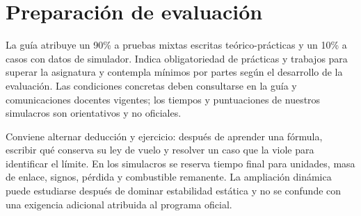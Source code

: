 \section{Preparación de evaluación}
La guía atribuye un 90\% a pruebas mixtas escritas teórico-prácticas y un 10\% a casos con datos de simulador. Indica obligatoriedad de prácticas y trabajos para superar la asignatura y contempla mínimos por partes según el desarrollo de la evaluación. Las condiciones concretas deben consultarse en la guía y comunicaciones docentes vigentes; los tiempos y puntuaciones de nuestros simulacros son orientativos y no oficiales.

Conviene alternar deducción y ejercicio: después de aprender una fórmula, escribir qué conserva su ley de vuelo y resolver un caso que la viole para identificar el límite. En los simulacros se reserva tiempo final para unidades, masa de enlace, signos, pérdida y combustible remanente. La ampliación dinámica puede estudiarse después de dominar estabilidad estática y no se confunde con una exigencia adicional atribuida al programa oficial.
